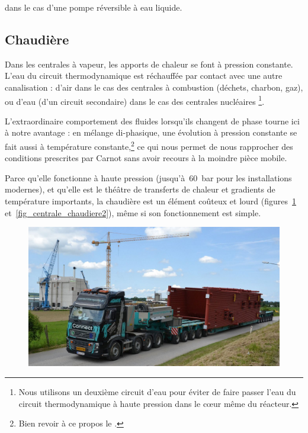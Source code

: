 		\begin{description}
			\item dans le cas d’une pompe réversible à eau liquide.
		\end{description}

		 

	\subsection{Chaudière}
	\label{ch_chaudière}

		Dans les centrales à vapeur, les apports de chaleur se font à pression constante. L’eau du circuit thermodynamique est réchauffée par contact avec une autre canalisation : d’air dans le cas des centrales à combustion (déchets, charbon, gaz), ou d’eau (d’un circuit secondaire) dans le cas des centrales nucléaires%
		\footnote{Nous utilisons un deuxième circuit d’eau pour éviter de faire passer l’eau du circuit thermodynamique à haute pression dans le cœur même du réacteur.}\nolinebreak.

		L’extraordinaire comportement des fluides lorsqu’ils changent de phase tourne ici à notre avantage : en mélange di-phasique, une évolution à pression constante se fait aussi à température constante,\footnote{Bien revoir à ce propos le \courscinq.}
		ce qui nous permet de nous rapprocher des conditions prescrites par Carnot sans avoir recours à la moindre pièce mobile.
		
		Parce qu’elle fonctionne à haute pression (jusqu’à~\SI{60}{\bar} pour les installations modernes), et qu’elle est le théâtre de transferts de chaleur et gradients de température importants, la chaudière est un élément coûteux et lourd (figures~\ref{fig_centrale_chaudiere1} et~\ref{fig_centrale_chaudiere2}), même si son fonctionnement est simple.

		\begin{figure}
			\begin{center}
				\includegraphics[width=\textwidth]{images/centrale_chaudiere_photo.jpg}
			\end{center}
			\label{fig_centrale_chaudiere1}
		\end{figure}

